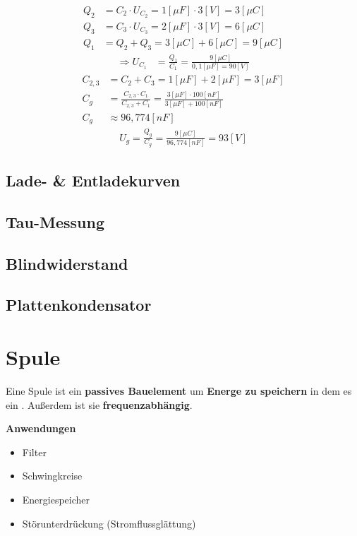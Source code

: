 \begin{align}
    Q_2&=C_2\cdot U_{C_2}=1[\mu F]\cdot 3[V]=3[\mu C] \\
    Q_3&=C_3\cdot U_{C_3}=2[\mu F]\cdot 3[V]=6[\mu C] \\
    Q_1&=Q_2+Q_3=3[\mu C]+6[\mu C]=9[\mu C]
\end{align}
\begin{align}
    \Rightarrow U_{C_1}&=\frac{Q_1}{C_1}=\frac{9[\mu C]}{0,1[\mu F]=90[V]}
\end{align}
\begin{align}
    C_{2,3}&=C_2+C_3=1[\mu F]+2[\mu F]=3[\mu F]\\
    C_g&=\frac{C_{2,3}\cdot C_1}{C_{2,3}+ C_1}=\frac{3[\mu F]\cdot 100[nF]}{3[\mu F]+ 100[nF]} \\
    C_g&\approx 96,774[nF]
\end{align}
\begin{align}
    U_g=\frac{Q_g}{C_g}=\frac{9[\mu C]}{96,774[nF]}=93[V]
\end{align}

\subsection{Lade- \& Entladekurven}
\subsection{Tau-Messung}
\subsection{Blindwiderstand}
\subsection{Plattenkondensator}

\section{Spule}
Eine Spule ist ein \textbf{passives Bauelement} um \textbf{Energe zu speichern} in dem es ein . Außerdem ist sie \textbf{frequenzabhängig}. 

\textbf{Anwendungen} \\
\begin{itemize}
    \item Filter
    \item Schwingkreise
    \item Energiespeicher
    \item Störunterdrückung (Stromflussglättung)
\end{itemize}

